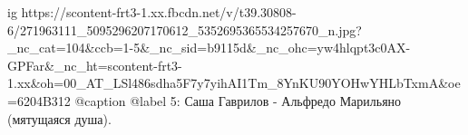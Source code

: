  
 
 
 
 

\ifcmt
  ig https://scontent-frt3-1.xx.fbcdn.net/v/t39.30808-6/271963111_5095296207170612_5352695365534257670_n.jpg?_nc_cat=104&ccb=1-5&_nc_sid=b9115d&_nc_ohc=yw4hlqpt3c0AX-GPFar&_nc_ht=scontent-frt3-1.xx&oh=00_AT_LSl486sdha5F7y7yihAI1Tm_8YnKU90YOHwYHLbTxmA&oe=6204B312
  @caption @label 5: Саша Гаврилов - Альфредо Марильяно (мятущаяся душа).
\fi
